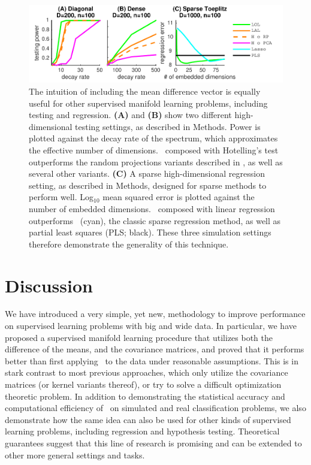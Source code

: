 \documentclass[10pt]{article}
\begin{document}
\begin{figure}
\centering
\includegraphics[width=1\linewidth]{../Figs/regression_power}
\caption{
The intuition of including the mean difference vector is equally useful for other supervised manifold learning problems, including testing and regression.
\textbf{(A)} and \textbf{(B)} show two different high-dimensional testing settings, as described in Methods.  Power is plotted against the decay rate of the spectrum, which approximates the effective number of dimensions.  \Lol~composed with Hotelling's test outperforms the random projections variants described in \cite{Lopes2011a}, as well as several other variants.
\textbf{(C)} A sparse high-dimensional regression setting, as described in Methods, designed for sparse methods to perform well.  Log$_{10}$ mean squared error is plotted against the number of embedded dimensions.
\Lol~composed with linear regression outperforms ~(cyan), the classic sparse regression method, as well as partial least squares (PLS; black).
These three simulation settings therefore demonstrate the generality of this technique.
}
\label{f:generalizations}
\end{figure}


\section*{Discussion}

We have introduced a very simple, yet new, methodology to improve performance on supervised learning problems with big and wide data.  In particular, we have proposed a supervised manifold learning procedure that utilizes both the difference of the means, and the covariance matrices, and proved that it performs better than first applying \Pca~to the data under reasonable assumptions.  This is in stark contrast to most previous approaches, which only utilize the covariance matrices (or kernel variants thereof), or try to solve a difficult optimization theoretic problem.  In addition to demonstrating the statistical accuracy and computational efficiency of \Lol~on simulated and real classification problems, we also demonstrate how the same idea can also be used for other kinds of supervised learning problems, including regression and hypothesis testing. Theoretical guarantees suggest that this line of research is promising and can be extended to other more general settings and tasks.
\end{document}
